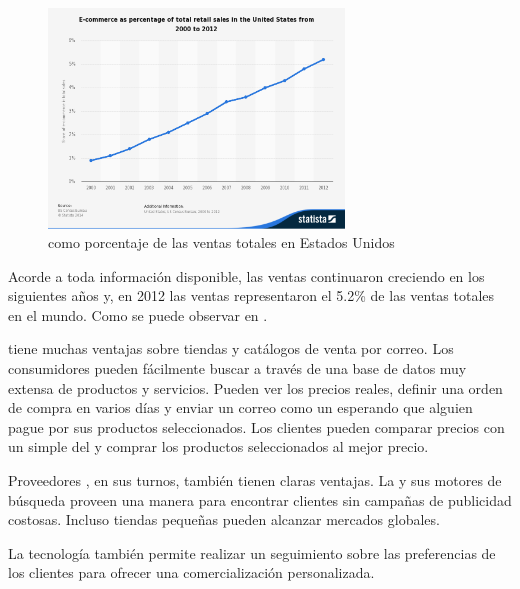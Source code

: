 \begin{figure}[h!]
	\centering
	\includegraphics[width=0.7\textwidth]{figuras/ecommerce_percent.jpg}
	\caption{\ecommerce como porcentaje de las ventas totales en Estados Unidos \cite{online_total_sales_2000_2012}}
	\label{figure:ecommerce_percent_sales}
\end{figure}

Acorde a toda información disponible, las ventas \ecommerce continuaron creciendo en los siguientes años y, en 2012 las ventas \ecommerce representaron el 5.2\% de las ventas totales en el mundo. Como se puede observar en .

\ecommerce tiene muchas ventajas sobre tiendas \brickandmortar y catálogos de venta por correo. Los consumidores pueden fácilmente buscar a través de una base de datos muy extensa de productos y servicios. Pueden ver los precios reales, definir una orden de compra en varios días y enviar un correo como un \wishlist esperando que alguien pague por sus productos seleccionados. Los clientes pueden comparar precios con un simple \click del \mouse y comprar los productos seleccionados al mejor precio.

Proveedores \online, en sus turnos, también tienen claras ventajas. La \web y sus motores de búsqueda proveen una manera para encontrar clientes sin campañas de publicidad costosas. Incluso tiendas \online pequeñas pueden alcanzar mercados globales. 

La tecnología \web también permite realizar un seguimiento sobre las preferencias de los clientes para ofrecer una comercialización personalizada.

